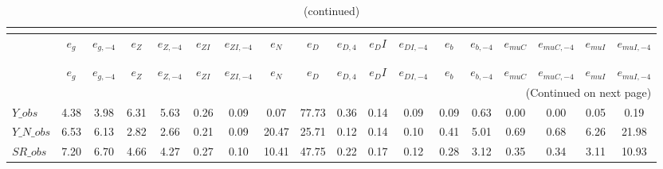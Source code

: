  
\begin{center}
\begin{longtable}{lccccccccccccccccc} 
\caption{VARIANCE DECOMPOSITION (in percent)}\\
 \label{Table:th_var_decomp_uncond}\\
\toprule 
$               $	 & 	 $           {e_g}$	 & 	 $      {e_{g,-4}}$	 & 	 $           {e_Z}$	 & 	 $      {e_{Z,-4}}$	 & 	 $        {e_{ZI}}$	 & 	 $     {e_{ZI,-4}}$	 & 	 $           {e_N}$	 & 	 $           {e_D}$	 & 	 $       {e_{D,4}}$	 & 	 $          {e_DI}$	 & 	 $     {e_{DI,-4}}$	 & 	 $           {e_b}$	 & 	 $      {e_{b,-4}}$	 & 	 $       {e_{muC}}$	 & 	 $    {e_{muC,-4}}$	 & 	 $       {e_{muI}}$	 & 	 $    {e_{muI,-4}}$\\
\midrule \endfirsthead 
\caption{(continued)}\\
 \toprule \\ 
$               $	 & 	 $           {e_g}$	 & 	 $      {e_{g,-4}}$	 & 	 $           {e_Z}$	 & 	 $      {e_{Z,-4}}$	 & 	 $        {e_{ZI}}$	 & 	 $     {e_{ZI,-4}}$	 & 	 $           {e_N}$	 & 	 $           {e_D}$	 & 	 $       {e_{D,4}}$	 & 	 $          {e_DI}$	 & 	 $     {e_{DI,-4}}$	 & 	 $           {e_b}$	 & 	 $      {e_{b,-4}}$	 & 	 $       {e_{muC}}$	 & 	 $    {e_{muC,-4}}$	 & 	 $       {e_{muI}}$	 & 	 $    {e_{muI,-4}}$\\
\midrule \endhead 
\midrule \multicolumn{18}{r}{(Continued on next page)} \\ \bottomrule \endfoot 
\bottomrule \endlastfoot 
$Y\_obs         $	 & 	            4.38	 & 	            3.98	 & 	            6.31	 & 	            5.63	 & 	            0.26	 & 	            0.09	 & 	            0.07	 & 	           77.73	 & 	            0.36	 & 	            0.14	 & 	            0.09	 & 	            0.09	 & 	            0.63	 & 	            0.00	 & 	            0.00	 & 	            0.05	 & 	            0.19 \\ 
$Y\_N\_obs      $	 & 	            6.53	 & 	            6.13	 & 	            2.82	 & 	            2.66	 & 	            0.21	 & 	            0.09	 & 	           20.47	 & 	           25.71	 & 	            0.12	 & 	            0.14	 & 	            0.10	 & 	            0.41	 & 	            5.01	 & 	            0.69	 & 	            0.68	 & 	            6.26	 & 	           21.98 \\ 
$SR\_obs        $	 & 	            7.20	 & 	            6.70	 & 	            4.66	 & 	            4.27	 & 	            0.27	 & 	            0.10	 & 	           10.41	 & 	           47.75	 & 	            0.22	 & 	            0.17	 & 	            0.12	 & 	            0.28	 & 	            3.12	 & 	            0.35	 & 	            0.34	 & 	            3.11	 & 	           10.93 \\ 

\end{longtable}
\end{center}
